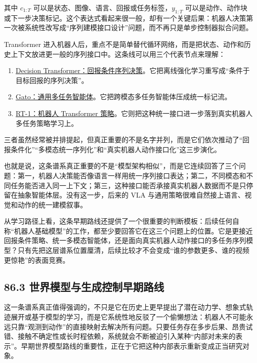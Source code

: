 其中 \(c_{1:T}\) 可以是状态、图像、语言、回报或任务标签，\(y_{1:T}\) 可以是动作、动作块或下一步决策标记。这个表达式看起来很一般，却有一个关键后果：机器人决策第一次被系统性改写成“序列建模接口设计”问题，而不再只是单步控制器拟合问题。

Transformer 进入机器人后，重点不是简单替代循环网络，而是把状态、动作和历史上下文放进更一般的序列接口中。这条线可以用三个代表节点来理解：

\begin{enumerate}
\item \href{https://arxiv.org/abs/2106.01345}{Decision Transformer：回报条件序列决策}。它把离线强化学习重写成“条件于目标回报的序列决策”。
\item \href{https://arxiv.org/abs/2205.06175}{Gato：通用多任务智能体}。它把跨模态多任务智能体压成统一标记流。
\item \href{https://arxiv.org/abs/2212.06817}{RT-1：机器人 Transformer 策略}。它则把这种统一接口进一步落到真实机器人多任务策略学习上。
\end{enumerate}

三者虽然经常被并排提起，但真正重要的不是名字并列，而是它们依次推动了“回报条件化”“多模态统一序列化”和“真实机器人动作接口化”这三步演化。

也就是说，这条谱系真正重要的不是“模型架构相似”，而是它连续回答了三个问题：第一，机器人决策能否像语言一样用统一序列接口表达；第二，不同模态和不同任务能否进入同一上下文；第三，这种接口能否承接真实机器人数据而不是只停留在抽象智能体层。没有这一步，后来的 VLA 与通用策略很难自然接上语言、视觉和动作的统一建模叙事。

从学习路径上看，这条早期路线还提供了一个很重要的判断模板：后续任何自称“机器人基础模型”的工作，都至少要回答它在这三个问题上的位置。它是更接近回报条件策略、统一多模态智能体，还是面向真实机器人动作接口的多任务序列模型？只有先把这层谱系位置厘清，后续比较才不会变成“谁的参数更多、谁的视频更惊艳”的表面竞赛。

\subsection*{86.3 世界模型与生成控制早期路线}


这一条谱系真正值得强调的，不只是它在历史上更早提出了潜在动力学、想象式轨迹展开或基于模型的学习，而是它系统性地反驳了一个偷懒想法：机器人不可能永远只靠“观测到动作”的直接映射去解决所有问题。只要任务存在多步后果、昂贵试错、接触不确定性或长时程依赖，系统就会不断被迫引入某种“内部对未来的表示”。早期世界模型路线的重要性，正在于它把这种内部表示重新变成正当研究对象。

